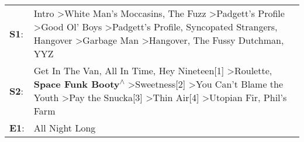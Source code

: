 \begin{supertabular}{p{0.03\textwidth}p{0.92\textwidth}}
 \textbf{S1}:  &  Intro\textsuperscript{} \textgreater \enspace White Man's Moccasins\textsuperscript{}, \enspace The Fuzz\textsuperscript{} \textgreater \enspace Padgett's Profile\textsuperscript{} \textgreater \enspace Good Ol' Boys\textsuperscript{} \textgreater \enspace Padgett's Profile\textsuperscript{}, \enspace Syncopated Strangers\textsuperscript{}, \enspace Hangover\textsuperscript{} \textgreater \enspace Garbage Man\textsuperscript{} \textgreater \enspace Hangover\textsuperscript{}, \enspace The Fussy Dutchman\textsuperscript{}, \enspace YYZ\textsuperscript{}  \enspace  \\
 \textbf{S2}:  &            Get In The Van\textsuperscript{}, \enspace All In Time\textsuperscript{}, \enspace Hey Nineteen[1]\textsuperscript{} \textgreater \enspace Roulette\textsuperscript{}, \enspace \textbf{Space Funk Booty\textsuperscript{$\wedge$}} \textgreater \enspace Sweetness[2]\textsuperscript{} \textgreater \enspace You Can't Blame the Youth\textsuperscript{} \textgreater \enspace Pay the Snucka[3]\textsuperscript{} \textgreater \enspace Thin Air[4]\textsuperscript{} \textgreater \enspace Utopian Fir\textsuperscript{}, \enspace Phil's Farm\textsuperscript{}  \enspace  \\
 \textbf{E1}:  &                                                                                                                                                                                                                                                                                                                                                                                                                                                                                                                                                All Night Long\textsuperscript{}  \enspace  \\
\end{supertabular}
